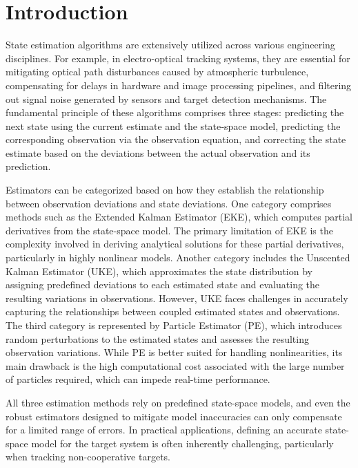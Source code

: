 \documentclass[sn-nature]{sn-jnl}%
\theoremstyle{thmstyleone}%
\theoremstyle{thmstyletwo}%
\theoremstyle{thmstylethree}%
\begin{document}

\maketitle

\section{Introduction}\label{sec1}

State estimation algorithms are extensively utilized across various engineering disciplines. For example, in electro-optical tracking systems, they are essential for mitigating optical path disturbances caused by atmospheric turbulence, compensating for delays in hardware and image processing pipelines, and filtering out signal noise generated by sensors and target detection mechanisms. The fundamental principle of these algorithms comprises three stages: predicting the next state using the current estimate and the state‐space model, predicting the corresponding observation via the observation equation, and correcting the state estimate based on the deviations between the actual observation and its prediction.

Estimators can be categorized based on how they establish the relationship between observation deviations and state deviations. One category comprises methods such as the Extended Kalman Estimator (EKE), which computes partial derivatives from the state-space model. The primary limitation of EKE is the complexity involved in deriving analytical solutions for these partial derivatives, particularly in highly nonlinear models. Another category includes the Unscented Kalman Estimator (UKE), which approximates the state distribution by assigning predefined deviations to each estimated state and evaluating the resulting variations in observations. However, UKE faces challenges in accurately capturing the relationships between coupled estimated states and observations. The third category is represented by Particle Estimator (PE), which introduces random perturbations to the estimated states and assesses the resulting observation variations. While PE is better suited for handling nonlinearities, its main drawback is the high computational cost associated with the large number of particles required, which can impede real-time performance.

All three estimation methods rely on predefined state-space models, and even the robust estimators designed to mitigate model inaccuracies can only compensate for a limited range of errors. In practical applications, defining an accurate state-space model for the target system is often inherently challenging, particularly when tracking non-cooperative targets.
\end{document}
